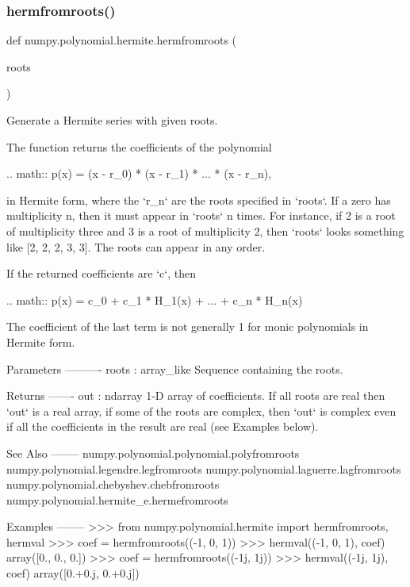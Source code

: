  \mbox{\label{namespacenumpy_1_1polynomial_1_1hermite_ab7e76d5b5e51dc804c63baff0f0b9af5}} 
\subsubsection{\texorpdfstring{hermfromroots()}{hermfromroots()}}
{\footnotesize\ttfamily def numpy.\+polynomial.\+hermite.\+hermfromroots (\begin{DoxyParamCaption}\item[{}]{roots }\end{DoxyParamCaption})}

\begin{DoxyVerb}Generate a Hermite series with given roots.

The function returns the coefficients of the polynomial

.. math:: p(x) = (x - r_0) * (x - r_1) * ... * (x - r_n),

in Hermite form, where the `r_n` are the roots specified in `roots`.
If a zero has multiplicity n, then it must appear in `roots` n times.
For instance, if 2 is a root of multiplicity three and 3 is a root of
multiplicity 2, then `roots` looks something like [2, 2, 2, 3, 3]. The
roots can appear in any order.

If the returned coefficients are `c`, then

.. math:: p(x) = c_0 + c_1 * H_1(x) + ... +  c_n * H_n(x)

The coefficient of the last term is not generally 1 for monic
polynomials in Hermite form.

Parameters
----------
roots : array_like
    Sequence containing the roots.

Returns
-------
out : ndarray
    1-D array of coefficients.  If all roots are real then `out` is a
    real array, if some of the roots are complex, then `out` is complex
    even if all the coefficients in the result are real (see Examples
    below).

See Also
--------
numpy.polynomial.polynomial.polyfromroots
numpy.polynomial.legendre.legfromroots
numpy.polynomial.laguerre.lagfromroots
numpy.polynomial.chebyshev.chebfromroots
numpy.polynomial.hermite_e.hermefromroots

Examples
--------
>>> from numpy.polynomial.hermite import hermfromroots, hermval
>>> coef = hermfromroots((-1, 0, 1))
>>> hermval((-1, 0, 1), coef)
array([0.,  0.,  0.])
>>> coef = hermfromroots((-1j, 1j))
>>> hermval((-1j, 1j), coef)
array([0.+0.j, 0.+0.j])\end{DoxyVerb}
 \mbox{\label{namespacenumpy_1_1polynomial_1_1hermite_afc39b291807683689cfc5fed696a5f88}} 

